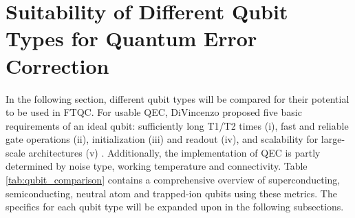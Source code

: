\section{Suitability of Different Qubit Types for Quantum Error Correction}
\label{section: qec}
In the following section, different qubit types will be compared for their potential to be used in FTQC. For usable QEC, DiVincenzo proposed five basic requirements of an ideal qubit: sufficiently long T1/T2 times (i), fast and reliable gate operations (ii), initialization (iii) and readout (iv), and scalability for large-scale architectures (v) \cite{DIVINCENZO1998419}.  Additionally, the implementation of QEC is partly determined by noise type, working temperature and connectivity. Table \ref{tab:qubit_comparison} contains a comprehensive overview of superconducting, semiconducting, neutral atom and trapped-ion qubits using these metrics. The specifics for each qubit type will be expanded upon in the following subsections.


